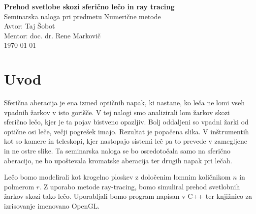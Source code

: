 \documentclass[a4paper,12pt]{article}
\begin{document}
    \begin{titlepage}
        \begin{center}
            \vspace*{3cm}
            {\LARGE \textbf{Prehod svetlobe skozi sferično lečo in ray tracing}} \\[1cm]
            {\large Seminarska naloga pri predmetu Numerične metode} \\[2cm]

            {\Large Avtor: Taj Šobot} \\[0.5cm]
            {\Large Mentor: doc. dr. Rene Markovič} \\[0.5cm]

            \vfill
            {\large \today}
        \end{center}
    \end{titlepage}

    \flushleft

    \pagebreak
    \renewcommand{\contentsname}{Kazalo}
    \tableofcontents{}
    \pagebreak


    \section{Uvod}

    Sferična aberacija je ena izmed optičnih napak, ki nastane, ko leča ne lomi vseh vpadnih žarkov v isto gorišče.
    V tej nalogi smo analizirali lom žarkov skozi sferično lečo, kjer je ta pojav bistveno opazljiv.
    Bolj oddaljeni so vpadni žarki od optične osi leče, večji pogrešek imajo.
    Rezultat je popačena slika.
    V inštrumentih kot so kamere in teleskopi, kjer nastopajo sistemi leč pa to prevede v zamegljene in ne ostre slike.
    Ta seminarska naloga se bo osredotočala samo na sferično aberacijo, ne bo upoštevala kromatske aberacija ter drugih napak pri lečah.\\
    \vspace{0.5cm}

    Lečo bomo modelirali kot krogelno ploskev z določenim lomnim količnikom $n$ in polmerom $r$.
    Z uporabo metode ray-tracing, bomo simuliral prehod svetlobnih žarkov skozi tako lečo.
    Uporabljali bomo program napisan v C++ ter knjižnico za izrisovanje imenovano OpenGL.


\end{document}
